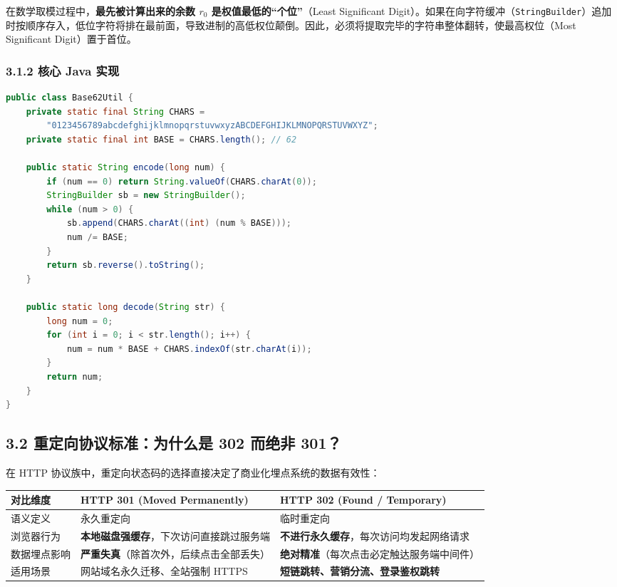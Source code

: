 \documentclass[11pt,a4paper]{ctexart}
\begin{document}
\begin{tcolorbox}[colback=yellow!5!white,colframe=orange!80!black,title=\textbf{为什么必须执行字符串翻转（Reverse）？}]
在数学取模过程中，\textbf{最先被计算出来的余数 $r_0$ 是权值最低的“个位”}（Least Significant Digit）。如果在向字符缓冲（\texttt{StringBuilder}）追加时按顺序存入，低位字符将排在最前面，导致进制的高低权位颠倒。因此，必须将提取完毕的字符串整体翻转，使最高权位（Most Significant Digit）置于首位。
\end{tcolorbox}

\subsubsection{3.1.2 核心 Java 实现}
\begin{lstlisting}[language=Java]
public class Base62Util {
    private static final String CHARS = 
        "0123456789abcdefghijklmnopqrstuvwxyzABCDEFGHIJKLMNOPQRSTUVWXYZ";
    private static final int BASE = CHARS.length(); // 62

    public static String encode(long num) {
        if (num == 0) return String.valueOf(CHARS.charAt(0));
        StringBuilder sb = new StringBuilder();
        while (num > 0) {
            sb.append(CHARS.charAt((int) (num % BASE)));
            num /= BASE;
        }
        return sb.reverse().toString();
    }

    public static long decode(String str) {
        long num = 0;
        for (int i = 0; i < str.length(); i++) {
            num = num * BASE + CHARS.indexOf(str.charAt(i));
        }
        return num;
    }
}
\end{lstlisting}

\subsection{3.2 重定向协议标准：为什么是 302 而绝非 301？}
在 HTTP 协议族中，重定向状态码的选择直接决定了商业化埋点系统的数据有效性：

\begin{table}[htbp]
\centering
\begin{tabularx}{\textwidth}{@{}l X X@{}}
\toprule
\textbf{对比维度} & \textbf{HTTP 301 (Moved Permanently)} & \textbf{HTTP 302 (Found / Temporary)} \\ \midrule
语义定义 & 永久重定向 & 临时重定向 \\
浏览器行为 & \textbf{本地磁盘强缓存}，下次访问直接跳过服务端 & \textbf{不进行永久缓存}，每次访问均发起网络请求 \\
数据埋点影响 & \textbf{严重失真}（除首次外，后续点击全部丢失） & \textbf{绝对精准}（每次点击必定触达服务端中间件） \\
适用场景 & 网站域名永久迁移、全站强制 HTTPS & \textbf{短链跳转、营销分流、登录鉴权跳转} \\ \bottomrule
\end{tabularx}
\end{table}
\end{document}
